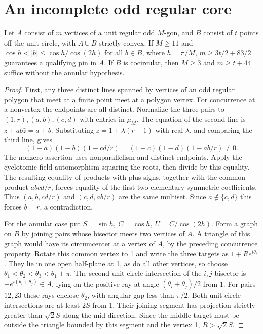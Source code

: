 \section{An incomplete odd regular core}

\begin{theorem}[982-R07, 982-R08]
Let \(A\) consist of \(m\) vertices of a unit regular odd \(M\)-gon, and \(B\)
consist of \(t\) points off the unit circle, with \(A\cup B\) strictly convex.
If \(M\ge11\) and \(\cos h<|b|\le\cos h/\cos(2h)\) for all \(b\in B\),
where \(h=\pi/M\), \(m\ge3t/2+83/2\) guarantees a qualifying pin in \(A\).
If \(B\) is cocircular, then \(M\ge3\) and \(m\ge t+44\) suffice without the annular hypothesis.
\end{theorem}

\begin{proof}
First, any three distinct lines spanned by vertices of an odd regular polygon
that meet at a finite point meet at a polygon vertex. For concurrence at
a nonvertex the endpoints are all distinct. Normalize the three pairs to
\((1,r),(a,b),(c,d)\) with entries in \(\mu_M\). The equation of the second
line is \(z+ab\bar z=a+b\). Substituting \(z=1+\lambda(r-1)\) with real
\(\lambda\), and comparing the third line, gives
\[
 (1-a)(1-b)(1-cd/r)=(1-c)(1-d)(1-ab/r)\ne0.
\]
The nonzero assertion uses nonparallelism and distinct endpoints.
Apply the cyclotomic field automorphism squaring the roots, then divide
by this equality. The resulting equality of products with plus signs,
together with the common product \(abcd/r\), forces equality of the
first two elementary symmetric coefficients. Thus \((a,b,cd/r)\)
and \((c,d,ab/r)\) are the same multiset. Since \(a\notin\{c,d\}\) this
forces \(b=r\), a contradiction.

For the annular case put \(S=\sin h,\ C=\cos h,\ U=C/\cos(2h)\).
Form a graph on \(B\) by joining pairs whose bisector meets two vertices
of \(A\). A triangle of this graph would have its circumcenter at
a vertex of \(A\), by the preceding concurrence property. Rotate this
common vertex to 1 and write the three targets as \(1+R e^{i\theta_i}\).
They lie in one open half-plane at 1, as do all other vertices, so
choose \(\theta_1<\theta_2<\theta_3<\theta_1+\pi\). The second unit-circle
intersection of the \(i,j\) bisector is
\(-e^{i(\theta_i+\theta_j)}\in A\), lying on the positive ray at angle
\((\theta_i+\theta_j)/2\) from 1. For pairs \(12,23\) these rays enclose
\(\theta_2\), with angular gap less than \(\pi/2\). Both unit-circle
intersections are at least \(2S\) from 1. Their joining segment has
projection strictly greater than \(\sqrt 2 S\) along the mid-direction.
Since the middle target must be outside the triangle bounded by this
segment and the vertex 1, \(R>\sqrt2 S\).


\end{proof}
